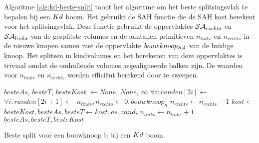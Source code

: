 Algoritme \ref{alg:kd-beste-split} toont het algoritme om het beste splitsingsvlak te bepalen bij een $Kd$ boom.
Het gebruikt de SAH functie die de SAH kost berekent voor het splitsingsvlak.
Deze functie gebruikt de oppervlaktes $\mathcal{SA}_{rechts}$ en $\mathcal{SA}_{links}$ van de gesplitste volumes en de aantallen primitieven $n_{links}$ en $n_{rechts}$ in de nieuwe knopen samen met de oppervlakte $bouwknoop_{\mathcal{SA}}$ van de huidige knoop.
Het splitsen in kindvolumes en het berekenen van deze oppervlaktes is triviaal omdat de omhullende volumes asgealigneerde balken zijn.
De waarden voor $n_{links}$ en $n_{rechts}$ worden efficiënt berekend door te sweepen.

\begin{dutchalgorithm}
    \begin{algorithmic}       
            \State $besteAs$, $besteT$, $besteKost$ $\gets None$, $None$, $\infty$
                \State $\forall i: randen[2i]\gets$ 
                \State $\forall i: randen[2i+1]\gets$ 
                \State {}
                \State $n_{links}, n_{rechts} \gets 0, bouwknoop_n$
                        \State $n_{rechts} \gets n_{rechts} - 1$
                    \EndIf
                    \State $kost \gets$ 
                        \State $besteKost, besteAs, besteT \gets kost, as, rand_t$
                    \EndIf
                        \State $n_{links} \gets n_{links} + 1$
                    \EndIf
                \EndFor                
            \EndFor
            \State \Return $besteAs, besteT, besteKost$
        \EndFunction
    \end{algorithmic}
    \caption{Beste split voor een bouwknoop b bij een $Kd$ boom.}
    \label{alg:kd-beste-split}
\end{dutchalgorithm}



